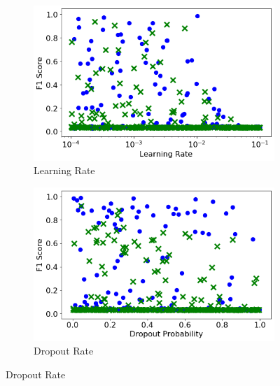 \begin{figure}[H]
     \centering
     \begin{subfigure}[b]{0.49\textwidth}
         \centering
         \includegraphics[width=\textwidth]{images/cnn_learning_rate.png}
         \caption{Learning Rate}
         \label{fig:cnn_learning_rate}
     \end{subfigure}
     \hfill
     \begin{subfigure}[b]{0.49\textwidth}
         \centering
         \includegraphics[width=\textwidth]{images/cnn_dropout.png}
         \caption{Dropout Rate}
         \label{fig:cnn_dropout}
     \end{subfigure}


\end{figure}
